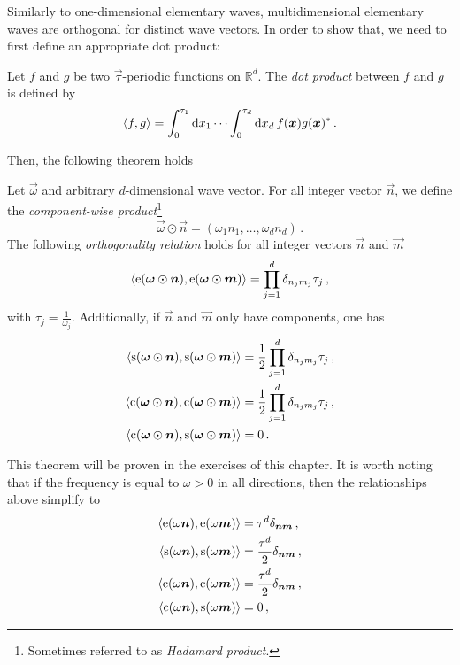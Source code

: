 Similarly to one-dimensional elementary waves, multidimensional elementary waves are
orthogonal for distinct wave vectors. In order to show that, we need to first define an
appropriate dot product:
\begin{definition}
  Let $f$ and $g$ be two $\vec{\tau}$-periodic functions on $\mathbb{R}^d$. The \emph{dot
  product} between $f$ and $g$ is defined by
  \begin{equation}
    \braket{f,g}=\int_0^{\tau_1}\mathrm{d} x_1\cdots\int_0^{\tau_d}\mathrm{d} x_d\,
    f(\bm{x})g(\bm{x})^*\,.
  \end{equation}
\end{definition}
Then, the following theorem holds
\begin{theorem}
  \label{thm:nd-orth}
  Let $\vec{\omega}$ and arbitrary $d$-dimensional wave vector. For all integer vector
  $\vec{n}$, we define the \emph{component-wise product}\footnote{Sometimes referred to as
  \emph{Hadamard product}.}
  \begin{equation}
    \vec{\omega}\odot\vec{n}=(\omega_1n_1,\dots,\omega_dn_d)\,.
  \end{equation}
  The following \emph{orthogonality relation} holds for all integer vectors $\vec{n}$ and
  $\vec{m}$
  \begin{align}
    \braket{\operatorname{e}(\bm{\omega}\odot\bm{n}),\operatorname{e}(\bm{\omega}\odot\bm{m})}=\prod_{j=1}^{d}\delta_{n_jm_j}\tau_j\,,
  \end{align}
  with $\tau_j=\frac{1}{\omega_j}$. Additionally, if $\vec{n}$ and $\vec{m}$ only have
  components, one has
  \begin{align}
    \braket{\operatorname{s}(\bm{\omega}\odot\bm{n}),\operatorname{s}(\bm{\omega}\odot\bm{m})}
    &=\frac{1}{2}\prod_{j=1}^{d}\delta_{n_jm_j}\tau_j\,,\\
    \braket{\operatorname{c}(\bm{\omega}\odot\bm{n}),\operatorname{c}(\bm{\omega}\odot\bm{m})}
    &=\frac{1}{2}\prod_{j=1}^{d}\delta_{n_jm_j}\tau_j\,,\\
    \braket{\operatorname{c}(\bm{\omega}\odot\bm{n}),\operatorname{s}(\bm{\omega}\odot\bm{m})}&=0\,.
  \end{align}
\end{theorem}
This theorem will be proven in the exercises of this chapter. It is worth noting that if
the frequency is equal to $\omega>0$ in all directions, then the relationships above
simplify to
\begin{align}
  \braket{\operatorname{e}(\omega\bm{n}),\operatorname{e}(\omega\bm{m})}&=\tau^d\delta_{\bm{n}\bm{m}}\,,\\
  \braket{\operatorname{s}(\omega\bm{n}),\operatorname{s}(\omega\bm{m})}&=\frac{\tau^d}{2}\delta_{\bm{n}\bm{m}}\,,\\
  \braket{\operatorname{c}(\omega\bm{n}),\operatorname{c}(\omega\bm{m})}&=\frac{\tau^d}{2}\delta_{\bm{n}\bm{m}}\,,\\
  \braket{\operatorname{c}(\omega\bm{n}),\operatorname{s}(\omega\bm{m})}&=0\,,
\end{align}
